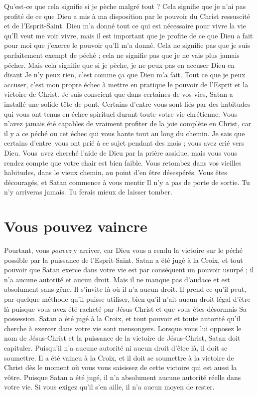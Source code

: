 Qu'est-ce que cela signifie si je pèche malgré tout ?
 Cela signifie que je n'ai pas profité de ce que Dieu a mis à ma disposition
 par le pouvoir du Christ ressuscité et de l'Esprit-Saint.
 Dieu m'a donné tout ce qui est nécessaire pour vivre la vie
 qu'Il veut me voir vivre, mais il est important que je profite
 de ce que Dieu a fait pour moi \ocadr que j'exerce le pouvoir
 qu'Il m'a donné.
 Cela ne signifie pas que je suis parfaitement exempt de péché ;
 cela ne signifie pas que je ne vais plus jamais pécher.
 Mais cela signifie que si je pèche, je ne peux pas en accuser Dieu
 en disant\frcolon{}
 \Og Je n'y peux rien, c'est comme ça que Dieu m'a fait. \Fg{}
 Tout ce que je peux accuser, c'est mon propre échec à mettre en pratique
 le pouvoir de l'Esprit et la victoire de Christ.
 Je suis conscient que dans certaines de vos vies,
 Satan a installé une solide tête de pont.
 Certains d'entre vous sont liés par des habitudes qui vous ont tenus
 en échec spirituel durant toute votre vie chrétienne.
 Vous n'avez jamais été capables de vraiment profiter de la joie complète
 en Christ, car il y a ce péché ou cet échec qui vous hante
 tout au long du chemin. Je sais que certains d'entre~vous ont prié
 à ce sujet pendant des mois ; vous avez crié vers Dieu.
 Vous~avez cherché l'aide de Dieu par la prière assidue,
 mais vous vous rendez compte que votre chair est bien faible.
 Vous retombez dans vos vieilles habitudes,
 dans le vieux chemin, au point d'en être désespérés.
 Vous êtes découragés, et Satan commence à vous mentir\frcolon{}
 \Og Il n'y a pas de porte de sortie. Tu n'y arriveras jamais.
 Tu ferais mieux de laisser tomber. \Fg{}
 \nowidow[4]


\section{Vous pouvez vaincre}

Pourtant, vous \emph{pouvez} y arriver, car Dieu vous a rendu la victoire
 sur le péché possible par la puissance de l'Esprit-Saint.
 Satan a été jugé à la Croix, et tout pouvoir que Satan exerce
 dans votre vie est par conséquent un pouvoir usurpé ;
 il n'a aucune autorité et aucun droit.
 Mais il ne manque pas d'audace et est absolument sans-gêne. Il s'invite là où il n'a aucun
 droit. Il prend ce qu'il peut, par quelque méthode qu'il puisse utiliser,
 bien qu'il n'ait aucun droit légal d'être là puisque vous avez été racheté
 par Jésus-Christ et que vous êtes désormais Sa possession.
 Satan a été jugé à la Croix, et tout pouvoir et toute autorité qu'il cherche
 à exercer dans votre vie sont mensongers.
 Lorsque vous lui opposez le nom de Jésus-Christ et la puissance
 de la victoire de Jésus-Christ, Satan doit capituler.
 Puisqu'il n'a aucune autorité ni aucun droit d'être là, il doit se soumettre.
 Il a été vaincu à la Croix, et il doit se soumettre à la victoire de Christ
 dès le moment où vous vous saisissez de cette victoire qui est aussi la vôtre.
 Puisque Satan a été jugé, il n'a absolument aucune autorité réelle
 dans votre vie. Si vous exigez qu'il s'en aille,
 il n'a aucun moyen de rester.


